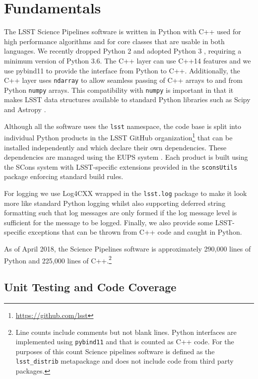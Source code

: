\section{Fundamentals}

The LSST Science Pipelines software is written in Python with C++ used for high performance algorithms and for core classes that are usable in both languages.
We recently dropped Python 2 and adopted Python 3 \citep{2017arXiv171200461J}, requiring a minimum version of Python 3.6.
The C++ layer can use C++14 features and we use pybind11 to provide the interface from Python to C++.
Additionally, the C++ layer uses \texttt{ndarray} to allow seamless passing of C++ arrays to and from Python \texttt{numpy} arrays.
This compatibility with \texttt{numpy} is important in that it makes LSST data structures available to standard Python libraries such as Scipy and Astropy \citep{2016SPIE.9913E..0GJ,2018AJ....156..123A}.

Although all the software uses the \texttt{lsst} namespace, the code base is split into individual Python products in the LSST GitHub organization\footnote{\url{https://github.com/lsst}} that can be installed independently and which declare their own dependencies.
These dependencies are managed using the EUPS system \citep{EUPS,2018SPIE10707E..09J}.
Each product is built using the SCons system \citep{2005Scons1377085} with LSST-specific extensions provided in the \texttt{sconsUtils} package enforcing standard build rules.

For logging we use Log4CXX wrapped in the \texttt{lsst.log} package to make it look more like standard Python logging whilst also supporting deferred string formatting such that log messages are only formed if the log message level is sufficient for the message to be logged.
Finally, we also provide some LSST-specific exceptions that can be thrown from C++ code and caught in Python.

As of April 2018, the Science Pipelines software is approximately 290,000 lines of Python and 225,000 lines of C++.\footnote{Line counts include comments but not blank lines. Python interfaces are implemented using \texttt{pybind11} and that is counted as C++ code. For the purposes of this count Science pipelines software is defined as the \texttt{lsst\_distrib} metapackage and does not include code from third party packages.}

\subsection{Unit Testing and Code Coverage}

